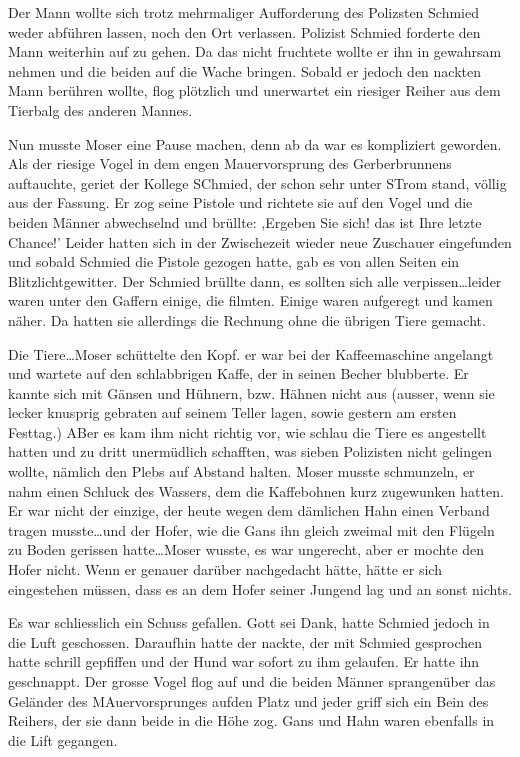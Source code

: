 Der Mann wollte sich trotz mehrmaliger Aufforderung des Polizsten Schmied weder abführen lassen, noch den Ort verlassen. Polizist Schmied forderte den Mann weiterhin auf zu gehen. Da das nicht fruchtete wollte er ihn in gewahrsam nehmen und die beiden auf die Wache bringen. Sobald er jedoch den nackten Mann berühren wollte, flog plötzlich und unerwartet ein riesiger Reiher aus dem Tierbalg des anderen Mannes. 

Nun musste Moser eine Pause machen, denn ab da war es kompliziert geworden. Als der riesige Vogel in dem engen Mauervorsprung des Gerberbrunnens auftauchte, geriet der Kollege SChmied, der schon sehr unter STrom stand, völlig aus der Fassung. Er zog seine Pistole und richtete sie auf den Vogel und die beiden Männer abwechselnd und brüllte: ,Ergeben Sie sich! das ist Ihre letzte Chance!' Leider hatten sich in der Zwischezeit wieder neue Zuschauer eingefunden und sobald Schmied die Pistole gezogen hatte, gab es von allen Seiten ein Blitzlichtgewitter. Der Schmied brüllte dann, es sollten sich alle verpissen\dots leider waren unter den Gaffern einige, die filmten. Einige waren aufgeregt und kamen näher. Da hatten sie allerdings die Rechnung ohne die übrigen Tiere gemacht.

Die Tiere\dots Moser schüttelte den Kopf. er war bei der Kaffeemaschine angelangt und wartete auf den schlabbrigen Kaffe, der in seinen Becher blubberte. Er kannte sich mit Gänsen und Hühnern, bzw. Hähnen nicht aus (ausser, wenn sie lecker knusprig gebraten auf seinem Teller lagen, sowie gestern am ersten Festtag.) ABer es kam ihm nicht richtig vor, wie schlau die Tiere es angestellt hatten und zu dritt unermüdlich schafften, was sieben Polizisten nicht gelingen wollte, nämlich den Plebs auf Abstand halten. Moser musste schmunzeln, er nahm einen Schluck des Wassers, dem die Kaffebohnen kurz zugewunken hatten. Er war nicht der einzige, der heute wegen dem dämlichen Hahn einen Verband tragen musste\dots und der Hofer, wie die Gans ihn gleich zweimal mit den Flügeln zu Boden gerissen hatte\dots Moser wusste, es war ungerecht, aber er mochte den Hofer nicht. Wenn er genauer darüber nachgedacht hätte, hätte er sich eingestehen müssen, dass es an dem Hofer seiner Jungend lag und an sonst nichts.

Es war schliesslich ein Schuss gefallen. Gott sei Dank, hatte Schmied jedoch in die Luft geschossen. Daraufhin hatte der nackte, der mit Schmied gesprochen hatte schrill gepfiffen und der Hund war sofort zu ihm gelaufen. Er hatte ihn geschnappt. Der grosse Vogel flog auf und die beiden Männer sprangenüber das Geländer des MAuervorsprunges aufden Platz und jeder griff sich ein Bein des Reihers, der sie dann beide in die Höhe zog. Gans und Hahn waren ebenfalls in die Lift gegangen.


